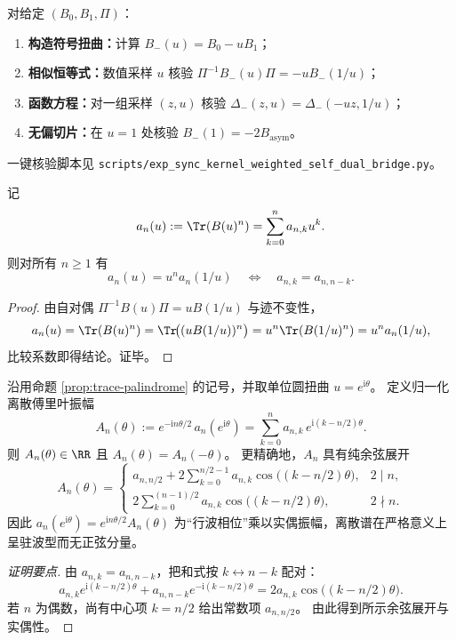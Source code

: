 \begin{remark}\label{rem:kernel-self-dual-sign-twist-bridge}
对给定 \((B_0,B_1,\Pi)\)：
\begin{enumerate}
  \item \textbf{构造符号扭曲：}计算 \(B_{-}(u)=B_0-uB_1\)；
  \item \textbf{相似恒等式：}数值采样 \(u\) 核验 \(\Pi^{-1}B_{-}(u)\Pi=-uB_{-}(1/u)\)；
  \item \textbf{函数方程：}对一组采样 \((z,u)\) 核验 \(\Delta_{-}(z,u)=\Delta_{-}(-uz,1/u)\)；
  \item \textbf{无偏切片：}在 \(u=1\) 处核验 \(B_{-}(1)=-2B_{\mathrm{asym}}\)。
\end{enumerate}
一键核验脚本见 \texttt{scripts/exp\_sync\_kernel\_weighted\_self\_dual\_bridge.py}。
\end{remark}

\begin{proposition}[周期迹多项式的回文对称]\label{prop:trace-palindrome}
记
\[
a_n(u):=\Tr(B(u)^n)=\sum_{k=0}^{n}a_{n,k}u^k.
\]
则对所有 $n\ge 1$ 有
\[
a_n(u)=u^n a_n(1/u)
\quad\Longleftrightarrow\quad
a_{n,k}=a_{n,n-k}.
\]
\end{proposition}

\begin{proof}
由自对偶 $\Pi^{-1}B(u)\Pi=uB(1/u)$ 与迹不变性，
\[
a_n(u)=\Tr(B(u)^n)=\Tr\!\bigl((uB(1/u))^n\bigr)=u^n\Tr(B(1/u)^n)=u^n a_n(1/u),
\]
比较系数即得结论。证毕。
\end{proof}

\begin{conclusion}\label{con:sync-kernel-weighted-teichmueller-standing-wave}
沿用命题 \ref{prop:trace-palindrome} 的记号，并取单位圆扭曲 \(u=e^{\mathrm{i}\theta}\)。
定义归一化离散傅里叶振幅
\[
A_n(\theta):=e^{-\mathrm{i}n\theta/2}\,a_n(e^{\mathrm{i}\theta})
=\sum_{k=0}^{n}a_{n,k}\,e^{\mathrm{i}(k-n/2)\theta}.
\]
则 \(A_n(\theta)\in\RR\) 且 \(A_n(\theta)=A_n(-\theta)\)。
更精确地，\(A_n\) 具有纯余弦展开
\[
\boxed{\ 
A_n(\theta)=
\begin{cases}
a_{n,n/2}+2\sum_{k=0}^{n/2-1} a_{n,k}\cos\!\bigl((k-n/2)\theta\bigr), & 2\mid n,\\[4pt]
2\sum_{k=0}^{(n-1)/2} a_{n,k}\cos\!\bigl((k-n/2)\theta\bigr), & 2\nmid n.
\end{cases}
\ }
\]
因此 \(a_n(e^{\mathrm{i}\theta})=e^{\mathrm{i}n\theta/2}A_n(\theta)\) 为“行波相位”乘以实偶振幅，离散谱在严格意义上呈驻波型而无正弦分量。
\end{conclusion}
\begin{proof}[证明要点]
由 \(a_{n,k}=a_{n,n-k}\)，把和式按 \(k\leftrightarrow n-k\) 配对：
\[
a_{n,k}e^{\mathrm{i}(k-n/2)\theta}+a_{n,n-k}e^{-\mathrm{i}(k-n/2)\theta}
=2a_{n,k}\cos\!\bigl((k-n/2)\theta\bigr).
\]
若 \(n\) 为偶数，尚有中心项 \(k=n/2\) 给出常数项 \(a_{n,n/2}\)。
由此得到所示余弦展开与实偶性。
\end{proof}

